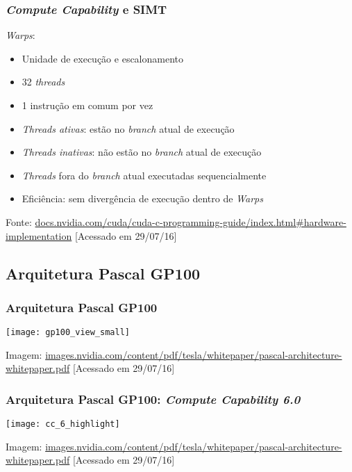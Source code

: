 \documentclass[10pt, compress, aspectratio=43, xcolor={table,usenames,dvipsnames}]{beamer}
\begin{document}
\begin{frame}
    \frametitle{\textit{Compute Capability} e SIMT}
    \textit{Warps}:
    \begin{itemize}
        \item Unidade de execução e escalonamento
        \item 32 \textit{threads}
        \item 1 \alert{instrução em comum} por vez
        \item \textit{Threads ativas}: estão no \textit{branch} atual de
            execução
        \item \textit{Threads inativas}: \alert{não} estão no \textit{branch}
            atual de execução
        \item \textit{Threads} fora do \textit{branch} atual executadas
            \alert{sequencialmente}
        \item Eficiência: sem divergência de execução dentro de \textit{Warps}
    \end{itemize}
    \vfill

    \begin{center}
        \tiny{Fonte: \url{docs.nvidia.com/cuda/cuda-c-programming-guide/index.html\#hardware-implementation} [Acessado em 29/07/16]}
    \end{center}
\end{frame}

\subsection{Arquitetura Pascal GP100}

\begin{frame}
    \frametitle{Arquitetura Pascal GP100}
    \centering
    \texttt{[image: gp100\_view\_small]}
    \vfill

    \tiny{Imagem: \url{images.nvidia.com/content/pdf/tesla/whitepaper/pascal-architecture-whitepaper.pdf} [Acessado em 29/07/16]}
\end{frame}

\begin{frame}
    \frametitle{Arquitetura Pascal GP100: \textit{Compute Capability 6.0}}
    \centering
    \texttt{[image: cc\_6\_highlight]}
    \vfill

    \tiny{Imagem: \url{images.nvidia.com/content/pdf/tesla/whitepaper/pascal-architecture-whitepaper.pdf} [Acessado em 29/07/16]}
\end{frame}
\end{document}
